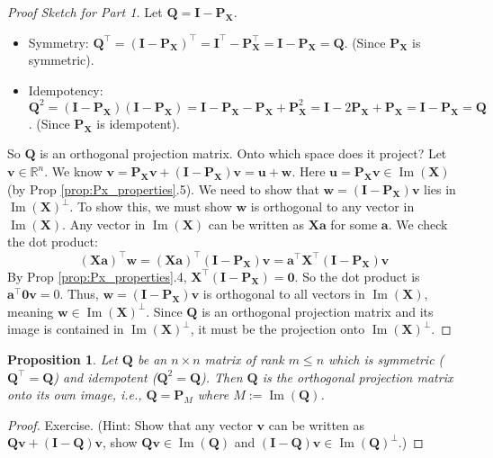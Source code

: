 \documentclass[11pt, a4paper]{article}
\DeclareMathOperator{\Image}{\mathrm{Im}}        %
\newtheorem{proposition}[theorem]{Proposition}
\theoremstyle{definition}
\theoremstyle{remark}
\newcommand{\RR}{\mathbb{R}}             %
\newcommand{\mat}[1]{\mathbf{#1}}       %
\newcommand{\vect}[1]{\bm{#1}}          %
\newcommand{\transpose}{^{\top}}        %
\begin{document}
\begin{proof}[Proof Sketch for Part 1]
Let $\mat{Q} = \mat{I} - \mat{P}_{\mat{X}}$.
\begin{itemize}
    \item Symmetry: $\mat{Q}\transpose = (\mat{I} - \mat{P}_{\mat{X}})\transpose = \mat{I}\transpose - \mat{P}_{\mat{X}}\transpose = \mat{I} - \mat{P}_{\mat{X}} = \mat{Q}$. (Since $\mat{P}_{\mat{X}}$ is symmetric).
    \item Idempotency: $\mat{Q}^2 = (\mat{I} - \mat{P}_{\mat{X}})(\mat{I} - \mat{P}_{\mat{X}}) = \mat{I} - \mat{P}_{\mat{X}} - \mat{P}_{\mat{X}} + \mat{P}_{\mat{X}}^2 = \mat{I} - 2\mat{P}_{\mat{X}} + \mat{P}_{\mat{X}} = \mat{I} - \mat{P}_{\mat{X}} = \mat{Q}$. (Since $\mat{P}_{\mat{X}}$ is idempotent).
\end{itemize}
So $\mat{Q}$ is an orthogonal projection matrix. Onto which space does it project?
Let $\vect{v} \in \RR^n$. We know $\vect{v} = \mat{P}_{\mat{X}}\vect{v} + (\mat{I} - \mat{P}_{\mat{X}})\vect{v} = \vect{u} + \vect{w}$.
Here $\vect{u} = \mat{P}_{\mat{X}}\vect{v} \in \Image(\mat{X})$ (by Prop \ref{prop:Px_properties}.5).
We need to show that $\vect{w} = (\mat{I} - \mat{P}_{\mat{X}})\vect{v}$ lies in $\Image(\mat{X})^{\perp}$. To show this, we must show $\vect{w}$ is orthogonal to any vector in $\Image(\mat{X})$. Any vector in $\Image(\mat{X})$ can be written as $\mat{X}\vect{a}$ for some $\vect{a}$. We check the dot product:
\[ (\mat{X}\vect{a})\transpose \vect{w} = (\mat{X}\vect{a})\transpose (\mat{I} - \mat{P}_{\mat{X}})\vect{v} = \vect{a}\transpose \mat{X}\transpose (\mat{I} - \mat{P}_{\mat{X}}) \vect{v} \]
By Prop \ref{prop:Px_properties}.4, $\mat{X}\transpose (\mat{I} - \mat{P}_{\mat{X}}) = \mat{0}$. So the dot product is $\vect{a}\transpose \mat{0} \vect{v} = 0$.
Thus, $\vect{w} = (\mat{I} - \mat{P}_{\mat{X}})\vect{v}$ is orthogonal to all vectors in $\Image(\mat{X})$, meaning $\vect{w} \in \Image(\mat{X})^{\perp}$.
Since $\mat{Q}$ is an orthogonal projection matrix and its image is contained in $\Image(\mat{X})^{\perp}$, it must be the projection onto $\Image(\mat{X})^{\perp}$.
\end{proof}

\begin{proposition}
Let $\mat{Q}$ be an $n \times n$ matrix of rank $m \leq n$ which is symmetric ($\mat{Q}\transpose = \mat{Q}$) and idempotent ($\mat{Q}^2 = \mat{Q}$). Then $\mat{Q}$ is the orthogonal projection matrix onto its own image, i.e., $\mat{Q} = \mat{P}_{M}$ where $M := \Image(\mat{Q})$.
\end{proposition}
\begin{proof}
Exercise. (Hint: Show that any vector $\vect{v}$ can be written as $\mat{Q}\vect{v} + (\mat{I}-\mat{Q})\vect{v}$, show $\mat{Q}\vect{v} \in \Image(\mat{Q})$ and $(\mat{I}-\mat{Q})\vect{v} \in \Image(\mat{Q})^{\perp}$.)
\end{proof}
\end{document}
